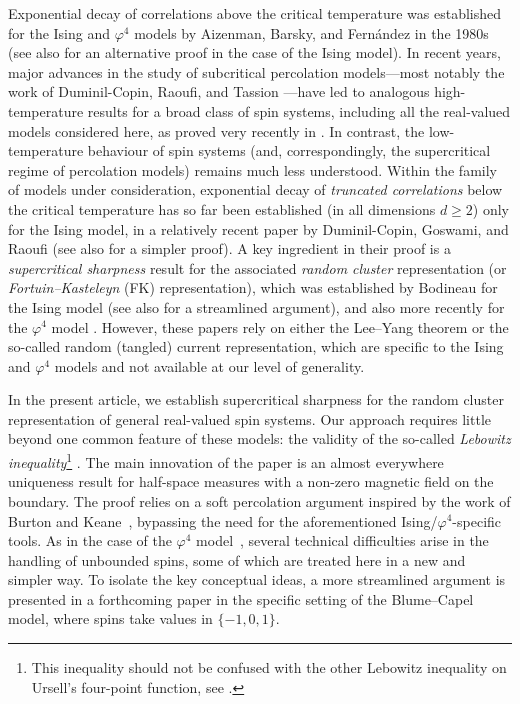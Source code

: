 \documentclass[11pt,a4paper]{article}
\numberwithin{equation}{section}
\theoremstyle{plain}
\theoremstyle{definition}
\begin{document}
Exponential decay of correlations above the critical temperature was established for the Ising and $\varphi^4$ models by Aizenman, Barsky, and Fernández in the 1980s \cite{AizenmanBarskyFernandezSharpnessIsing1987} (see also \cite{DuminilTassionNewProofSharpness2016} for an alternative proof in the case of the Ising model). In recent years, major advances in the study of subcritical percolation models—most notably the work of Duminil-Copin, Raoufi, and Tassion \cite{DCRT19}—have led to analogous high-temperature results for a broad class of spin systems, including all the real-valued models considered here, as proved very recently in \cite{PanaVeisubcrit}. In contrast, the low-temperature behaviour of spin systems
(and, correspondingly, the supercritical regime of percolation models) remains much less understood.
Within the family of models under consideration, exponential decay of \emph{truncated correlations} below the critical temperature has so far been established (in all dimensions $d\geq 2$) only for the Ising model, in a relatively recent paper by Duminil-Copin, Goswami, and Raoufi \cite{DCGR20} (see also \cite{GPPS26} for a simpler proof). A key ingredient in their proof is a \emph{supercritical sharpness} result for the associated \emph{random cluster} representation (or \emph{Fortuin--Kasteleyn} (FK) representation), which was established by Bodineau for the Ising model \cite{Bod05} (see also \cite{SeveroSlabIsing2023} for a streamlined argument), and also more recently for the $\varphi^4$ model \cite{gunaratnam2025supercritical}.
However, these papers rely on either the Lee--Yang theorem or the so-called random (tangled) current representation, which are specific to the Ising and $\varphi^4$ models and not available at our level of generality.  

In the present article, we establish supercritical sharpness for the random cluster representation of general real-valued spin systems. Our approach requires little beyond one common feature of these models: the validity of the so-called \emph{Lebowitz inequality}\footnote{This inequality should not be confused with the other Lebowitz inequality on Ursell's four-point function, see \cite{Lebowitz1974Inequ}.} \cite{Lebowitz1977CoexistencePhasesIsing,lebowitz1978number}. The main innovation of the paper is an almost everywhere 
uniqueness result for half-space measures with a non-zero magnetic field on the 
boundary. The proof relies on a soft percolation argument inspired by the 
work of Burton and Keane~\cite{BurtonKeane1989density}, bypassing the need for the aforementioned Ising/$\varphi^4$-specific tools. As in the case of 
the $\varphi^4$ model~\cite{gunaratnam2025supercritical}, several 
technical difficulties arise in the handling of unbounded spins, some of 
which are treated here in a new and simpler way. To isolate the key 
conceptual ideas, a more streamlined argument is presented in a forthcoming 
paper \cite{GKPPS26} in the specific setting of the Blume--Capel model, where spins take 
values in $\{-1,0,1\}$.
\end{document}
